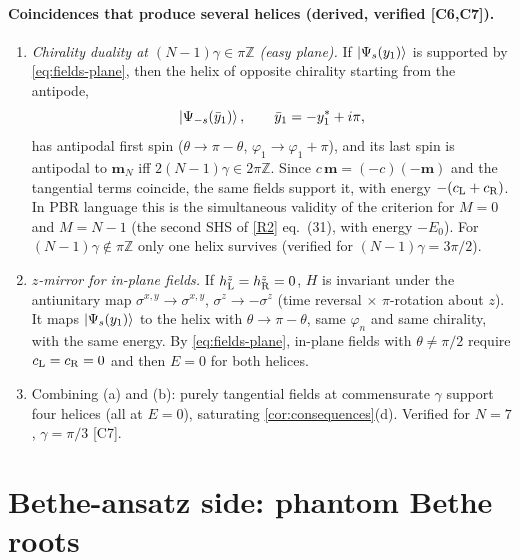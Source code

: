 \documentclass[11pt,a4paper]{article}
\theoremstyle{definition}
\newcommand{\ver}[1]{\textsf{[#1]}}   %
\begin{document}
\paragraph{Coincidences that produce several helices (derived, verified \ver{C6,C7}).}
\begin{enumerate}[label=(\alph*)]
\item \emph{Chirality duality at $(N-1)\gamma\in\pi\mathbb Z$ (easy plane).} If $\ket{\Psi_s(y_1)}$ is supported by \eqref{eq:fields-plane}, then the helix of opposite chirality starting from the antipode,
\begin{equation}\label{eq:dual}
\ket{\Psi_{-s}(\bar y_1)},\qquad \bar y_1=-y_1^*+i\pi,
\end{equation}
has antipodal first spin ($\theta\to\pi-\theta$, $\varphi_1\to\varphi_1+\pi$), and its last spin is antipodal to $\mathbf m_N$ iff $2(N-1)\gamma\in2\pi\mathbb Z$. Since $c\,\mathbf m=(-c)(-\mathbf m)$ and the tangential terms coincide, the same fields support it, with energy $-(c_{\rm L}+c_{\rm R})$. In PBR language this is the simultaneous validity of the criterion for $M=0$ and $M=N-1$ (the second SHS of \ref{R2} eq.~(31), with energy $-E_0$). For $(N-1)\gamma\notin\pi\mathbb Z$ only one helix survives (verified for $(N-1)\gamma=3\pi/2$).
\item \emph{$z$-mirror for in-plane fields.} If $h^z_{\rm L}=h^z_{\rm R}=0$, $H$ is invariant under the antiunitary map $\sigma^{x,y}\to\sigma^{x,y}$, $\sigma^z\to-\sigma^z$ (time reversal $\times$ $\pi$-rotation about $z$). It maps $\ket{\Psi_s(y_1)}$ to the helix with $\theta\to\pi-\theta$, same $\varphi_n$ and same chirality, with the same energy. By \eqref{eq:fields-plane}, in-plane fields with $\theta\neq\pi/2$ require $c_{\rm L}=c_{\rm R}=0$ and then $E=0$ for both helices.
\item Combining (a) and (b): purely tangential fields at commensurate $\gamma$ support four helices (all at $E=0$), saturating \cref{cor:consequences}(d). Verified for $N=7$, $\gamma=\pi/3$ \ver{C7}.
\end{enumerate}

\section{Bethe-ansatz side: phantom Bethe roots}\label{sec:PBR}
\end{document}
